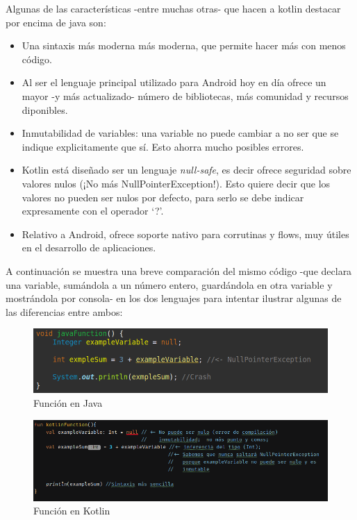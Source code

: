 Algunas de las características -entre muchas otras- que hacen a kotlin destacar por encima de java son:
\begin{itemize}
    \item Una sintaxis más moderna más moderna, que permite hacer más con menos código.
    \item Al ser el lenguaje principal utilizado para Android hoy en día ofrece un mayor -y más actualizado- número de bibliotecas, más comunidad y recursos diponibles.
    \item Inmutabilidad de variables: una variable no puede cambiar a no ser que se indique explicitamente que sí. Esto ahorra mucho posibles errores.
    \item Kotlin está diseñado ser un lenguaje \textit{null-safe}, es decir ofrece seguridad sobre valores nulos (¡No más NullPointerException!). Esto quiere decir que los valores no pueden ser nulos por defecto, para serlo se debe indicar expresamente con el operador ‘?’.
    \item Relativo a Android, ofrece soporte nativo para corrutinas y flows, muy útiles en el desarrollo de aplicaciones.
\end{itemize}
A continuación se muestra una breve comparación del mismo código -que declara una variable, sumándola a un número entero, guardándola en otra variable y mostrándola por consola- en los dos lenguajes para intentar ilustrar algunas de las diferencias entre ambos:
\begin{figure}[h]
	\centering
	\includegraphics[width = 1\textwidth]{Imagenes/Fuentes/javaFun.png}
	\caption{Función en Java}
	\label{fig:javaFun}
\end{figure}
\begin{figure}[h]
	\centering
	\includegraphics[width = 1\textwidth]{Imagenes/Fuentes/kotlinFun.png}
	\caption{Función en Kotlin}
	\label{fig:kotlinFun}
\end{figure}

